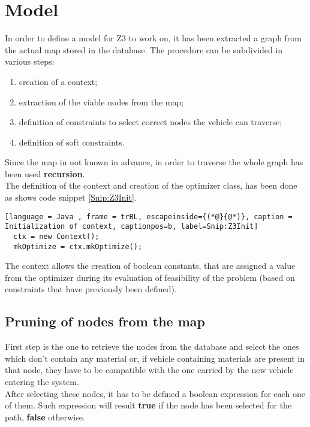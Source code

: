 
\section{Model}
In order to define a model for Z3 to work on, it has been extracted a graph from the actual map stored in the database. The procedure can be subdivided in various steps:
\begin{enumerate}
  \item creation of a context;
  \item extraction of the viable nodes from the map;
  \item definition of constraints to select correct nodes the vehicle can traverse;
  \item definition of soft constraints.
\end{enumerate}
Since the map in not known in advance, in order to traverse the whole graph has been used \textbf{recursion}.\\
The definition of the context and creation of the optimizer class, has been done as shows code snippet \ref{Snip:Z3Init}.
\begin{lstlisting}[language = Java , frame = trBL, escapeinside={(*@}{@*)}, caption = Initialization of context, captionpos=b, label=Snip:Z3Init]
  ctx = new Context();
  mkOptimize = ctx.mkOptimize();
\end{lstlisting}
The context allows the creation of boolean constants, that are assigned a value from the optimizer during its evaluation of feasibility of the problem (based on constraints that have previously been defined).

\subsection{Pruning of nodes from the map}
First step is the one to retrieve the nodes from the database and select the ones which don't contain any material or, if vehicle containing materials are present in that node, they have to be compatible with the one carried by the new vehicle entering the system.\\
After selecting these nodes, it has to be defined a boolean expression for each one of them. Such expression will result \textbf{true} if the node has been selected for the path, \textbf{false} otherwise.\\

